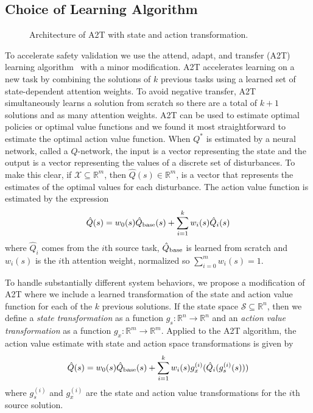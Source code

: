 \subsection{Choice of Learning Algorithm}
\begin{figure}
\centering

\caption{Architecture of A2T with state and action transformation.}
\label{fig:a2t_architecture}
\end{figure}

To accelerate safety validation we use the attend, adapt, and transfer (A2T) learning algorithm~\cite{rajendran2017attend} with a minor modification. A2T accelerates learning on a new task by combining the solutions of $k$ previous tasks using a learned set of state-dependent attention weights. To avoid negative transfer, A2T simultaneously learns a solution from scratch so there are a total of $k+1$ solutions and as  many attention weights. A2T can be used to estimate optimal policies or optimal value functions and we found it most straightforward to estimate the optimal action value function. When $Q^*$ is estimated by a neural network, called a $Q$-network, the input is a vector representing the state and the output is a vector representing the values of a discrete set of disturbances. To make this clear, if $\mathcal{X} \subseteq \mathbb{R}^m$, then $\hat{Q}(s) \in \mathbb{R}^m$, is a vector that represents the estimates of the optimal values for each disturbance. The action value function is estimated by the expression
\begin{equation}
\hat{Q}(s) = w_0(s) \hat{Q}_{\rm base}(s) + \sum_{i=1}^k w_i(s) \hat{Q}_i(s) \label{eq:A2T}
\end{equation}
where $\hat{Q}_i$ comes from the $i$th source task, $\hat{Q}_{\rm base}$ is learned from scratch and $w_i(s)$ is the $i$th attention weight, normalized so $\sum_{i=0}^m w_i(s) = 1$.


To handle substantially different system behaviors, we propose a modification of A2T where we include a learned transformation of the state and action value function for each of the $k$ previous solutions. If the state space $\mathcal{S} \subseteq \mathbb{R}^n$, then we define a \emph{state transformation} as a function $g_s : \mathbb{R}^n \to \mathbb{R}^n$ and an \emph{action value transformation} as a function $g_x : \mathbb{R}^m \to \mathbb{R}^m$. Applied to the A2T algorithm, the action value estimate with state and action space transformations is given by
\begin{equation}
\hat{Q}(s) = w_0(s) \hat{Q}_{\rm base}(s) + \sum_{i=1}^k w_i(s) g_x^{(i)}(\hat{Q}_i(g_s^{(i)}(s)))
\end{equation}
where $g_s^{(i)}$ and $g_x^{(i)}$ are the state and action value transformations for the $i$th source solution. 



